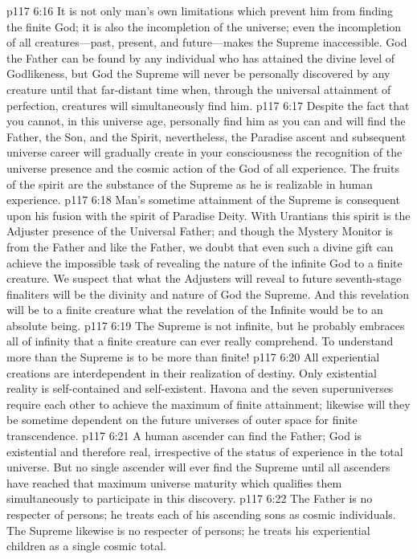 \vs p117 6:16 It is not only man’s own limitations which prevent him from finding the finite God; it is also the incompletion of the universe; even the incompletion of all creatures---past, present, and future---makes the Supreme inaccessible. God the Father can be found by any individual who has attained the divine level of Godlikeness, but God the Supreme will never be personally discovered by any  creature until that far\hyp{}distant time when, through the universal attainment of perfection,  creatures will simultaneously find him.
\vs p117 6:17 Despite the fact that you cannot, in this universe age, personally find him as you can and will find the Father, the Son, and the Spirit, nevertheless, the Paradise ascent and subsequent universe career will gradually create in your consciousness the recognition of the universe presence and the cosmic action of the God of all experience. The fruits of the spirit are the substance of the Supreme as he is realizable in human experience.
\vs p117 6:18 Man’s sometime attainment of the Supreme is consequent upon his fusion with the spirit of Paradise Deity. With Urantians this spirit is the Adjuster presence of the Universal Father; and though the Mystery Monitor is from the Father and like the Father, we doubt that even such a divine gift can achieve the impossible task of revealing the nature of the infinite God to a finite creature. We suspect that what the Adjusters will reveal to future seventh\hyp{}stage finaliters will be the divinity and nature of God the Supreme. And this revelation will be to a finite creature what the revelation of the Infinite would be to an absolute being.
\vs p117 6:19 The Supreme is not infinite, but he probably embraces all of infinity that a finite creature can ever really comprehend. To understand more than the Supreme is to be more than finite!
\vs p117 6:20 All experiential creations are interdependent in their realization of destiny. Only existential reality is self\hyp{}contained and self\hyp{}existent. Havona and the seven superuniverses require each other to achieve the maximum of finite attainment; likewise will they be sometime dependent on the future universes of outer space for finite transcendence.
\vs p117 6:21 A human ascender can find the Father; God is existential and therefore real, irrespective of the status of experience in the total universe. But no single ascender will ever find the Supreme until all ascenders have reached that maximum universe maturity which qualifies them simultaneously to participate in this discovery.
\vs p117 6:22 The Father is no respecter of persons; he treats each of his ascending sons as cosmic individuals. The Supreme likewise is no respecter of persons; he treats his experiential children as a single cosmic total.
